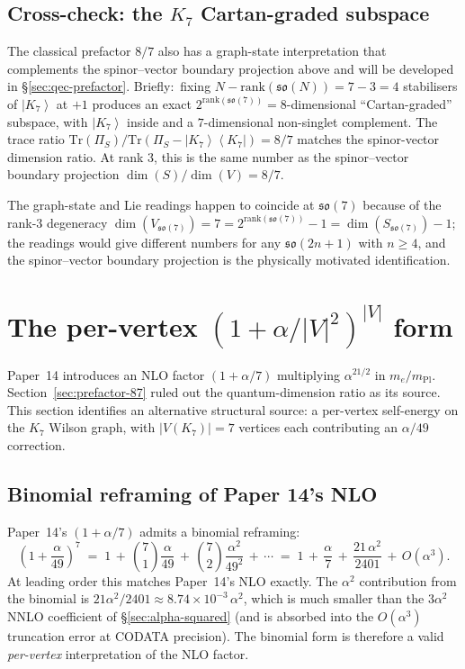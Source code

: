 \documentclass[11pt]{article}
\newcommand{\so}{\mathfrak{so}}
\newcommand{\ket}[1]{\left|#1\right\rangle}
\newcommand{\bra}[1]{\left\langle#1\right|}
\newcommand{\mPl}{m_{\mathrm{Pl}}}
\newcommand{\rank}{\mathrm{rank}}
\newcommand{\Tr}{\mathrm{Tr}}
\begin{document}
\subsection{Cross-check: the $K_7$ Cartan-graded subspace}
\label{sec:prefactor-87-qec-cross}

The classical prefactor $8/7$ also has a graph-state interpretation
that complements the spinor--vector boundary projection above and
will be developed in \S\ref{sec:qec-prefactor}.  Briefly:\ fixing
$N - \rank(\so(N)) = 7 - 3 = 4$ stabilisers of $\ket{K_7}$ at
$+1$ produces an exact $2^{\rank(\so(7))} = 8$-dimensional
``Cartan-graded'' subspace, with $\ket{K_7}$ inside and a
$7$-dimensional non-singlet complement.  The trace ratio
$\Tr(\Pi_S) / \Tr(\Pi_S - \ket{K_7}\!\bra{K_7}) = 8/7$ matches the
spinor-vector dimension ratio.  At rank 3, this is the same number
as the spinor--vector boundary projection $\dim(S)/\dim(V) = 8/7$.

The graph-state and Lie readings happen to coincide at $\so(7)$
because of the rank-3 degeneracy
$\dim(V_{\so(7)}) = 7 = 2^{\rank(\so(7))} - 1 = \dim(S_{\so(7)}) - 1$;
the readings would give different numbers for any $\so(2n+1)$ with
$n \geq 4$, and the spinor--vector boundary projection is the
physically motivated identification.

\section{The per-vertex $(1 + \alpha/|V|^2)^{|V|}$ form}
\label{sec:per-vertex}

Paper~14 introduces an NLO factor $(1 + \alpha/7)$ multiplying
$\alpha^{21/2}$ in $m_e/\mPl$.  Section~\ref{sec:prefactor-87}
ruled out the quantum-dimension ratio as its source.  This
section identifies an alternative structural source: a per-vertex
self-energy on the $K_7$ Wilson graph, with $|V(K_7)| = 7$
vertices each contributing an $\alpha/49$ correction.

\subsection{Binomial reframing of Paper 14's NLO}

Paper~14's $(1 + \alpha/7)$ admits a binomial reframing:
\begin{equation}
  \left(1 + \frac{\alpha}{49}\right)^{\!7}
  \;=\; 1 \,+\, \binom{7}{1}\frac{\alpha}{49} \,+\, \binom{7}{2}\frac{\alpha^2}{49^2} \,+\, \cdots
  \;=\; 1 \,+\, \frac{\alpha}{7} \,+\, \frac{21\,\alpha^2}{2401} \,+\, O(\alpha^3).
  \label{eq:binomial-reframing}
\end{equation}
At leading order this matches Paper~14's NLO exactly.  The
$\alpha^2$ contribution from the binomial is
$21 \alpha^2 / 2401 \approx 8.74 \times 10^{-3}\,\alpha^2$, which
is much smaller than the $3 \alpha^2$ NNLO coefficient of
\S\ref{sec:alpha-squared} (and is absorbed into the $O(\alpha^3)$
truncation error at CODATA precision).  The binomial form is
therefore a valid \emph{per-vertex} interpretation of the NLO
factor.
\end{document}

